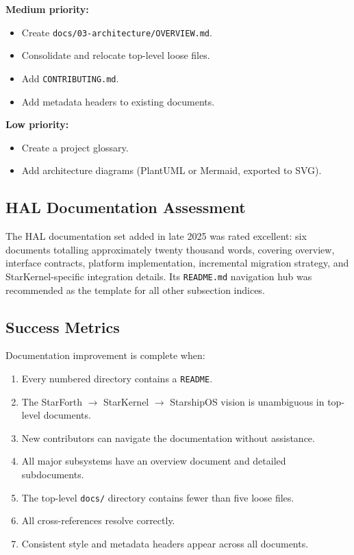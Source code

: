 \textbf{Medium priority:}
\begin{itemize}
  \item Create \texttt{docs/03-architecture/OVERVIEW.md}.
  \item Consolidate and relocate top-level loose files.
  \item Add \texttt{CONTRIBUTING.md}.
  \item Add metadata headers to existing documents.
\end{itemize}

\textbf{Low priority:}
\begin{itemize}
  \item Create a project glossary.
  \item Add architecture diagrams (PlantUML or Mermaid, exported to SVG).
\end{itemize}

\subsection{HAL Documentation Assessment}

The HAL documentation set added in late 2025 was rated excellent: six
documents totalling approximately twenty thousand words, covering overview,
interface contracts, platform implementation, incremental migration strategy,
and StarKernel-specific integration details. Its \texttt{README.md} navigation
hub was recommended as the template for all other subsection indices.

\subsection{Success Metrics}

Documentation improvement is complete when:
\begin{enumerate}
  \item Every numbered directory contains a \texttt{README}.
  \item The StarForth $\to$ StarKernel $\to$ StarshipOS vision is unambiguous in top-level documents.
  \item New contributors can navigate the documentation without assistance.
  \item All major subsystems have an overview document and detailed subdocuments.
  \item The top-level \texttt{docs/} directory contains fewer than five loose files.
  \item All cross-references resolve correctly.
  \item Consistent style and metadata headers appear across all documents.
\end{enumerate}
